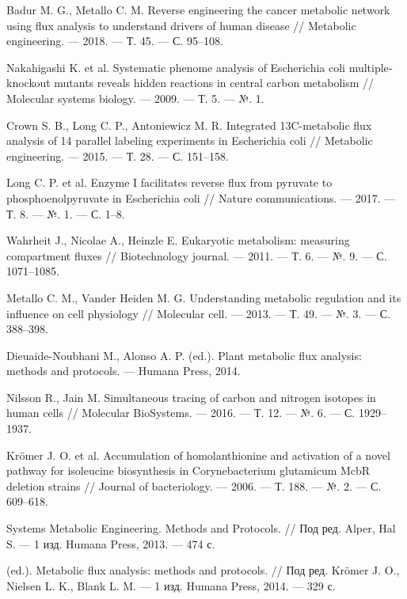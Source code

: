 \documentclass[14pt, a4paper]{extreport}
\begin{document}
\begin{thebibliography}{XXXX}
	Badur M. G., Metallo C. M. Reverse engineering the cancer metabolic network using flux analysis to understand drivers of human disease // Metabolic engineering. --- 2018. --- Т. 45. --- С. 95--108.
	
	Nakahigashi K. et al. Systematic phenome analysis of Escherichia coli multiple‐knockout mutants reveals hidden reactions in central carbon metabolism // Molecular systems biology. --- 2009. --- Т. 5. --- №. 1.
	
	Crown S. B., Long C. P., Antoniewicz M. R. Integrated 13C-metabolic flux analysis of 14 parallel labeling experiments in Escherichia coli // Metabolic engineering. --- 2015. --- Т. 28. --- С. 151--158.
	
	Long C. P. et al. Enzyme I facilitates reverse flux from pyruvate to phosphoenolpyruvate in Escherichia coli // Nature communications. --- 2017. --- Т. 8. --- №. 1. --- С. 1--8.
	
	Wahrheit J., Nicolae A., Heinzle E. Eukaryotic metabolism: measuring compartment fluxes // Biotechnology journal. --- 2011. --- Т. 6. --- №. 9. --- С. 1071--1085.
	
	Metallo C. M., Vander Heiden M. G. Understanding metabolic regulation and its influence on cell physiology // Molecular cell. --- 2013. --- Т. 49. --- №. 3. --- С. 388--398.
	
	Dieuaide-Noubhani M., Alonso A. P. (ed.). Plant metabolic flux analysis: methods and protocols. --- Humana Press, 2014.
	
	Nilsson R., Jain M. Simultaneous tracing of carbon and nitrogen isotopes in human cells // Molecular BioSystems. --- 2016. --- Т. 12. --- №. 6. --- С. 1929--1937.
	
	Krömer J. O. et al. Accumulation of homolanthionine and activation of a novel pathway for isoleucine biosynthesis in Corynebacterium glutamicum McbR deletion strains // Journal of bacteriology. --- 2006. --- Т. 188. --- №. 2. --- С. 609--618.
	
	Systems Metabolic Engineering. Methods and Protocols. // Под ред. Alper, Hal S. --- 1 изд. Humana Press, 2013. --- 474 с.
	
	(ed.). Metabolic flux analysis: methods and protocols. // Под ред. Krömer J. O., Nielsen L. K., Blank L. M. --- 1 изд. Humana Press, 2014. --- 329 с.
	

\end{thebibliography}
\end{document}
